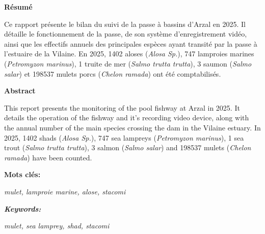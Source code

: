\documentclass[11pt,twocolumn,titlepage,twoside]{article}\usepackage[]{graphicx}\usepackage[]{xcolor}
\begin{document}
\onecolumn
\thispagestyle{empty}
\pagecolor{bleu_EV}
\begin{tcolorbox}[enhanced jigsaw,
                  colback=turquoise_EV!30,%
                  colframe=turquoise_EV,%
                  width=\textwidth,%
                  arc=3mm, auto outer arc,
                  boxrule=5pt,
                  drop shadow={bleu_EV!50!gray!80}
                 ]
\textbf{Résumé}\par

 \vspace{8mm}

 Ce rapport présente le bilan du suivi de la passe à bassins d'Arzal en
    \textcolor{orange_EV}{\num{2025}}. Il détaille le fonctionnement de la passe, de son système
    d'enregistrement vidéo, ainsi que les effectifs annuels des principales
    espèces ayant transité par la passe à l'estuaire de la Vilaine.
    En \textcolor{orange_EV}{\num{2025}},
    \textcolor{orange_EV}{\num{1402}} aloses (\textit{Alosa
    Sp.}),
    \textcolor{orange_EV}{\num{747}} lamproies marines (\textit{Petromyzon
    marinus}),
    \textcolor{orange_EV}{\num{1}} truite de mer (\textit{Salmo trutta trutta}),
    \textcolor{orange_EV}{\num{3}} saumon (\textit{Salmo salar}) et
    \textcolor{orange_EV}{\num{198537}} mulets porcs (\textit{Chelon ramada})
    ont été comptabilisés.  \par

   \vspace{8mm}

   \textbf{Abstract}\par

    \vspace{8mm}

    This report presents the monitoring of the pool fishway at Arzal in
    \textcolor{orange_EV}{\num{2025}}. It details the operation of the fishway and it's recording video
    device, along with the annual number of the main species crossing the dam in the Vilaine estuary.
    In \textcolor{orange_EV}{\num{2025}},
    \textcolor{orange_EV}{\num{1402}} shads (\textit{Alosa Sp.}),
    \textcolor{orange_EV}{\num{747}} sea lampreys (\textit{Petromyzon marinus}),
    \textcolor{orange_EV}{\num{1}} sea trout (\textit{Salmo trutta trutta}),
    \textcolor{orange_EV}{\num{3}} salmon (\textit{Salmo salar})
    and \textcolor{orange_EV}{\num{198537}} mulets (\textit{Chelon ramada})
    have been counted. \par


    \vspace{8mm}
    \textbf{Mots clés:}\par
     \textit{mulet, lamproie marine, alose, stacomi}\par
    \vspace{8mm}
     \textbf{\textit{Keywords:}}\par
     \textit{mulet, sea lamprey, shad, stacomi}
\end{tcolorbox}
\end{document}
